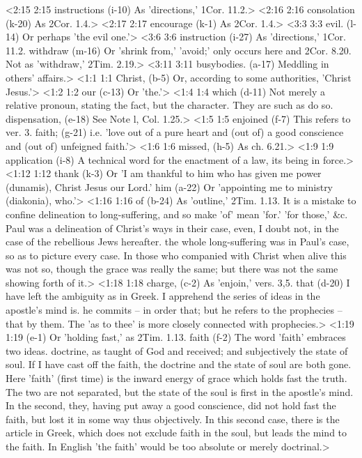 <2:15 2:15  instructions (i-10)  As 'directions,' 1Cor. 11.2.>
<2:16 2:16  consolation (k-20) As 2Cor. 1.4.>
<2:17 2:17  encourage (k-1)  As 2Cor. 1.4.>
<3:3 3:3  evil. (l-14)  Or perhaps 'the evil one.'>
<3:6 3:6  instruction (i-27)  As 'directions,' 1Cor. 11.2.
  withdraw (m-16)  Or 'shrink from,' 'avoid;' only occurs here and 2Cor. 8.20.  Not as 'withdraw,' 2Tim. 2.19.>
<3:11 3:11  busybodies. (a-17)  Meddling in others' affairs.>
<1:1 1:1  Christ, (b-5)  Or, according to some authorities, 'Christ Jesus.'>
<1:2 1:2  our (c-13)  Or 'the.'>
<1:4 1:4  which (d-11)  Not merely a relative pronoun, stating the fact, but the  character. They are such as do so.
  dispensation, (e-18)  See Note l, Col. 1.25.>
<1:5 1:5  enjoined (f-7)  This refers to ver. 3.
  faith; (g-21)  i.e. 'love out of a pure heart and (out of) a good conscience  and (out of) unfeigned faith.'>
<1:6 1:6  missed, (h-5)  As ch. 6.21.>
<1:9 1:9  application (i-8)  A technical word for the enactment of a law, its being in  force.>
<1:12 1:12  thank (k-3)  Or 'I am thankful to him who has given me power (dunamis),  Christ Jesus our Lord.'
  him (a-22)  Or 'appointing me to ministry (diakonia), who.'>
<1:16 1:16  of (b-24)  As 'outline,' 2Tim. 1.13. It is a mistake to confine  delineation to long-suffering, and so make 'of' mean 'for.'  'for those,' &c. Paul was a delineation of Christ's ways in  their case, even, I doubt not, in the case of the rebellious  Jews hereafter. the whole long-suffering was in Paul's case, so  as to picture every case. In those who companied with Christ  when alive this was not so, though the grace was really the  same; but there was not the same showing forth of it.>
<1:18 1:18  charge, (c-2)  As 'enjoin,' vers. 3,5.
  that (d-20)  I have left the ambiguity as in Greek. I apprehend the series  of ideas in the apostle's mind is. he commits -- in order that;  but he refers to the prophecies -- that by them. The 'as to  thee' is more closely connected with prophecies.>
<1:19 1:19   (e-1)  Or 'holding fast,' as 2Tim. 1.13.
  faith (f-2)  The word 'faith' embraces two ideas. doctrine, as taught of  God and received; and subjectively the state of soul. If I have  cast off the faith, the doctrine and the state of soul are both  gone. Here 'faith' (first time) is the inward energy of grace  which holds fast the truth. The two are not separated, but the  state of the soul is first in the apostle's mind. In the  second, they, having put away a good conscience, did not hold  fast the faith, but lost it in some way thus objectively. In  this second case, there is the article in Greek, which does not  exclude faith in the soul, but leads the mind to the faith. In  English 'the faith' would be too absolute or merely doctrinal.>
